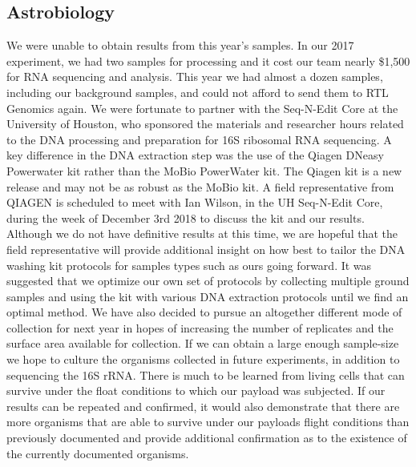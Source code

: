 \subsection{Astrobiology}
\label{sec:Astrobiology Results Discussion}
We were unable to obtain results from this year’s samples. In our 2017 experiment, we had two samples for processing and it cost our team nearly \$1,500 for RNA sequencing and analysis. This year we had almost a dozen samples, including our background samples, and could not afford to send them to RTL Genomics again. We were fortunate to partner with the Seq-N-Edit Core at the University of Houston, who sponsored the materials and researcher hours related to the DNA processing and preparation for 16S ribosomal RNA sequencing. A key difference in the DNA extraction step was the use of the Qiagen DNeasy Powerwater kit rather than the MoBio PowerWater kit. The Qiagen kit is a new release and may not be as robust as the MoBio kit. A field representative from QIAGEN is scheduled to meet with Ian Wilson, in the UH Seq-N-Edit Core, during the week of December 3rd 2018 to discuss the kit and our results. Although we do not have definitive results at this time, we are hopeful that the field representative will provide additional insight on how best to tailor the DNA washing kit protocols for samples types such as ours going forward. It was suggested that we optimize our own set of protocols by collecting multiple ground samples and using the kit with various DNA extraction protocols until we find an optimal method. We have also decided to pursue an altogether different mode of collection for next year in hopes of increasing the number of replicates and the surface area available for collection. If we can obtain a large enough sample-size we hope to culture the organisms collected in future experiments, in addition to sequencing the 16S rRNA. There is much to be learned from living cells that can survive under the float conditions to which our payload was subjected. If our results can be repeated and confirmed, it would also demonstrate that there are more organisms that are able to survive under our payloads flight conditions than previously documented and provide additional confirmation as to the existence of the currently documented organisms.
